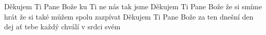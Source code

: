 \begin{TEXT}{Děkujem Ti Pane Bože}
\SLOKA {}ku Ti ne   nás  tak \NL
{} jsme        
\SLOKA Děkujem Ti Pane Bože že si smíme hrát \NL
že si také můžem spolu zazpívat 
\SLOKA Děkujem Ti Pane Bože za ten dnešní den \NL
dej ať tebe každý chválí v srdci svém \NL
\end{TEXT}
